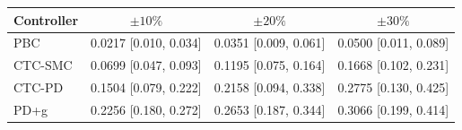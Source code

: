 \begin{tabular}{lccc}
\toprule
Controller & $\pm 10\%$ & $\pm 20\%$ & $\pm 30\%$ \\
\midrule
PBC     & 0.0217 [0.010, 0.034] & 0.0351 [0.009, 0.061] & 0.0500 [0.011, 0.089] \\
CTC-SMC & 0.0699 [0.047, 0.093] & 0.1195 [0.075, 0.164] & 0.1668 [0.102, 0.231] \\
CTC-PD  & 0.1504 [0.079, 0.222] & 0.2158 [0.094, 0.338] & 0.2775 [0.130, 0.425] \\
PD+g    & 0.2256 [0.180, 0.272] & 0.2653 [0.187, 0.344] & 0.3066 [0.199, 0.414] \\
\bottomrule
\end{tabular}
